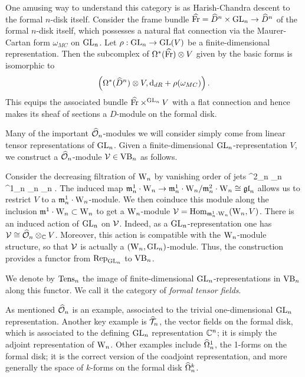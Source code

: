 \begin{rmk}
One amusing way to understand this category is as Harish-Chandra descent to the formal $n$-disk itself. 
Consider the frame bundle $\widehat{{\rm Fr}} = \widehat{D}^n \times {\rm GL}_n \to \widehat{D}^n$ of the formal $n$-disk itself, 
which possesses a natural flat connection via the Maurer-Cartan form $\omega_{MC}$ on ${\rm GL}_n$. 
Let $\rho: {\rm GL}_n \to {\rm GL}(V)$ be a finite-dimensional representation. 
Then the subcomplex of $\Omega^*(\widehat{{\rm Fr}})\otimes V$ given by the basic forms is isomorphic to
\[
\left(\Omega^*(\widehat{D}^n) \otimes V, {\rm d}_{dR} + \rho(\omega_{MC}) \right).
\]
This equips the associated bundle $\widehat{{\rm Fr}}\times^{{\rm GL}_n} V$ with a flat connection and 
hence makes its sheaf of sections a $D$-module on the formal disk.
\end{rmk}

Many of the important $\widehat{\mathcal O}_n$-modules we will consider simply come from linear tensor representations of ${\rm GL}_n$. 
Given a finite-dimensional ${\rm GL}_n$-representation $V$, we construct a $\widehat{\mathcal O}_n$-module $\mathcal{V} \in {\rm VB}_n$ as follows. 

Consider the decreasing filtration of ${{\rm W}_n}$ by vanishing order of jets 
\ben
\cdots \subset \fm^{2}_n _{n} \subset \fm^1_n _n _n .
\een 
The induced map ${\mathfrak m}_n^1 \cdot {{\rm W}_n} \to {\mathfrak m}_n^1 \cdot {{\rm W}_n} / {\mathfrak m}_n^2
\cdot {{\rm W}_n} \cong {\mathfrak{gl}}_n$ allows us to restrict $V$ to a ${\mathfrak m}_n^1 \cdot
{{\rm W}_n}$-module. 
We  then coinduce this module along the inclusion ${\mathfrak m}^1 \cdot {{\rm W}_n}
\subset {{\rm W}_n}$ to get a ${{\rm W}_n}$-module $\mathcal{V} = {\rm Hom}_{{\mathfrak m}_n^1 \cdot {{\rm W}_n}}({{\rm W}_n},V)$. 
There is an induced action of ${\rm GL}_n$ on $\mathcal{V}$. Indeed, as a ${\rm GL}_n$-representation one has $\mathcal{V} \cong \widehat{\mathcal O}_n \otimes_{\mathbb C} V$.
Moreover, this action is compatible with the ${{\rm W}_n}$-module structure, so that $\mathcal{V}$ is actually a $({{\rm W}_n}, {\rm GL}_n)$-module. 
Thus, the construction provides a functor  from ${\rm Rep}_{{\rm GL}_n}$ to
${\rm VB}_n$.

\begin{dfn} 
We denote by ${\rm Tens}_n$ the image of finite-dimensional ${\rm GL}_n$-representations in ${\rm VB}_n$ along this functor. 
We call it the category of {\em formal tensor fields}.
\end{dfn}

As mentioned $\widehat{\mathcal O}_n$ is an example, associated to the trivial one-dimensional ${\rm GL}_n$ representation.
Another key example is $\widehat{\mathcal T}_n$, the vector fields on the formal disk, which is associated to the defining ${\rm GL}_n$ representation $\mathbb C^n$; 
it is simply the adjoint representation of ${{\rm W}_n}$.
Other examples include $\widehat{\Omega}^1_n$, the 1-forms on the formal disk; it
is the correct version of the coadjoint representation, and more
generally the space of $k$-forms on the formal disk $\widehat{\Omega}^k_n$. 

